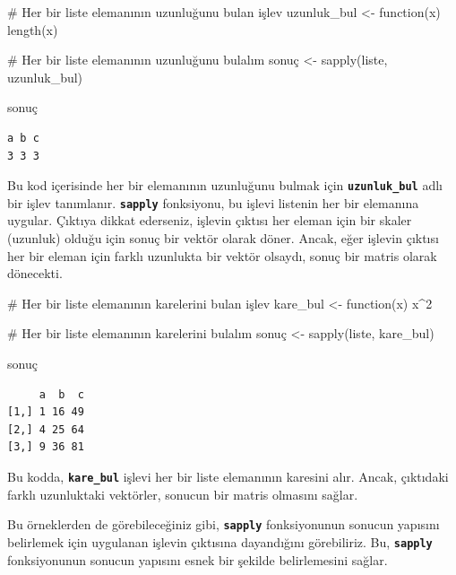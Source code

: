 \documentclass[
  letterpaper,
  DIV=11,
  numbers=noendperiod]{scrreprt}
\newenvironment{Shaded}{\begin{snugshade}}{\end{snugshade}}
\newcommand{\CommentTok}[1]{\textcolor[rgb]{0.37,0.37,0.37}{#1}}
\newcommand{\ControlFlowTok}[1]{\textcolor[rgb]{0.00,0.23,0.31}{#1}}
\newcommand{\DecValTok}[1]{\textcolor[rgb]{0.68,0.00,0.00}{#1}}
\newcommand{\FunctionTok}[1]{\textcolor[rgb]{0.28,0.35,0.67}{#1}}
\newcommand{\NormalTok}[1]{\textcolor[rgb]{0.00,0.23,0.31}{#1}}
\newcommand{\OtherTok}[1]{\textcolor[rgb]{0.00,0.23,0.31}{#1}}
\newcommand{\SpecialCharTok}[1]{\textcolor[rgb]{0.37,0.37,0.37}{#1}}
\begin{document}
\begin{Shaded}
\begin{Highlighting}[]
\CommentTok{\# Her bir liste elemanının uzunluğunu bulan işlev}
\NormalTok{uzunluk\_bul }\OtherTok{\textless{}{-}} \ControlFlowTok{function}\NormalTok{(x) }\FunctionTok{length}\NormalTok{(x)}

\CommentTok{\# Her bir liste elemanının uzunluğunu bulalım}
\NormalTok{sonuç }\OtherTok{\textless{}{-}} \FunctionTok{sapply}\NormalTok{(liste, uzunluk\_bul)}

\NormalTok{sonuç}
\end{Highlighting}
\end{Shaded}

\begin{verbatim}
a b c 
3 3 3 
\end{verbatim}

Bu kod içerisinde her bir elemanının uzunluğunu bulmak için
\textbf{\texttt{uzunluk\_bul}} adlı bir işlev tanımlanır.
\textbf{\texttt{sapply}} fonksiyonu, bu işlevi listenin her bir
elemanına uygular. Çıktıya dikkat ederseniz, işlevin çıktısı her eleman
için bir skaler (uzunluk) olduğu için sonuç bir vektör olarak döner.
Ancak, eğer işlevin çıktısı her bir eleman için farklı uzunlukta bir
vektör olsaydı, sonuç bir matris olarak dönecekti.

\begin{Shaded}
\begin{Highlighting}[]
\CommentTok{\# Her bir liste elemanının karelerini bulan işlev}
\NormalTok{kare\_bul }\OtherTok{\textless{}{-}} \ControlFlowTok{function}\NormalTok{(x) x}\SpecialCharTok{\^{}}\DecValTok{2}

\CommentTok{\# Her bir liste elemanının karelerini bulalım}
\NormalTok{sonuç }\OtherTok{\textless{}{-}} \FunctionTok{sapply}\NormalTok{(liste, kare\_bul)}

\NormalTok{sonuç}
\end{Highlighting}
\end{Shaded}

\begin{verbatim}
     a  b  c
[1,] 1 16 49
[2,] 4 25 64
[3,] 9 36 81
\end{verbatim}

Bu kodda, \textbf{\texttt{kare\_bul}} işlevi her bir liste elemanının
karesini alır. Ancak, çıktıdaki farklı uzunluktaki vektörler, sonucun
bir matris olmasını sağlar.

Bu örneklerden de görebileceğiniz gibi, \textbf{\texttt{sapply}}
fonksiyonunun sonucun yapısını belirlemek için uygulanan işlevin
çıktısına dayandığını görebiliriz. Bu, \textbf{\texttt{sapply}}
fonksiyonunun sonucun yapısını esnek bir şekilde belirlemesini sağlar.
\end{document}
